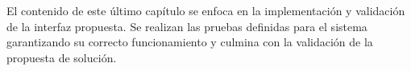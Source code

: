 El contenido de este último capítulo se enfoca en la implementación y validación de la interfaz propuesta. Se realizan las pruebas definidas para el sistema garantizando su correcto funcionamiento y culmina con la validación de la propuesta de solución.




%
%
%
